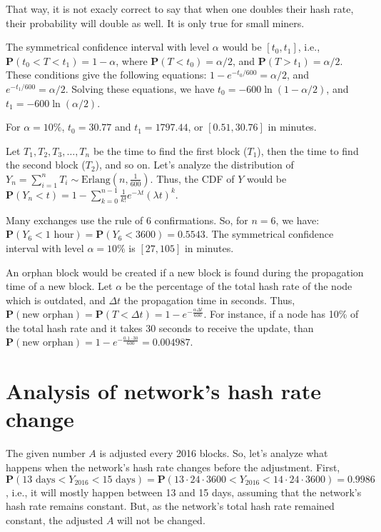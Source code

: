 That way, it is not exacly correct to say that when one doubles their hash rate, their probability will double as well. It is only true for small miners.


The symmetrical confidence interval with level $\alpha$ would be $[t_0, t_1]$, i.e., $\mathbf{P}(t_0 < T < t_1) = 1-\alpha$, where $\mathbf{P}(T<t_0) = \alpha/2$, and $\mathbf{P}(T>t_1) = \alpha/2$. These conditions give the following equations: $1 - e^{-t_0/600} = \alpha/2$, and $e^{-t_1/600} = \alpha/2$. Solving these equations, we have $t_0 = -600 \ln{(1 - \alpha/2)}$, and $t_1 = -600 \ln{(\alpha/2)}$.

For $\alpha = 10\%$, $t_0 = 30.77$ and $t_1 = 1797.44$, or $[0.51, 30.76]$ in minutes.

Let $T_1, T_2, T_3, \dots, T_n$ be the time to find the first block ($T_1$), then the time to find the second block ($T_2$), and so on. Let's analyze the distribution of $Y_n = \sum_{i=1}^{n} T_i \sim \text{Erlang}(n, \frac{1}{600})$. Thus, the CDF of $Y$ would be $\mathbf{P}(Y_n < t) = 1 - \sum_{k=0}^{n-1} \frac{1}{k!} e^{-\lambda t} (\lambda t)^k$.

Many exchanges use the rule of 6 confirmations. So, for $n=6$, we have: $\mathbf{P}(Y_6 < 1 \text{ hour}) = \mathbf{P}(Y_6 < 3600) = 0.5543$. The symmetrical confidence interval with level $\alpha=10\%$ is $[27, 105]$ in minutes.

An orphan block would be created if a new block is found during the propagation time of a new block. Let $\alpha$ be the percentage of the total hash rate of the node which is outdated, and $\Delta t$ the propagation time in seconds. Thus, $\mathbf{P}(\text{new orphan}) = \mathbf{P}(T < \Delta t) = 1 - e^{-\frac{\alpha \Delta t}{600}}$. For instance, if a node has 10\% of the total hash rate and it takes 30 seconds to receive the update, than $\mathbf{P}(\text{new orphan}) = 1 - e^{-\frac{0.1 \cdot 30}{600}} = 0.004987$.

\section{Analysis of network's hash rate change}

The given number $A$ is adjusted every 2016 blocks. So, let's analyze what happens when the network's hash rate changes before the adjustment. First, $\mathbf{P}(13 \text{ days} < Y_{2016} < 15 \text{ days}) = \mathbf{P}(13 \cdot 24 \cdot 3600 < Y_{2016} < 14 \cdot 24 \cdot 3600) = 0.9986$, i.e., it will mostly happen between 13 and 15 days, assuming that the network's hash rate remains constant. But, as the network's total hash rate remained constant, the adjusted $A$ will not be changed.

